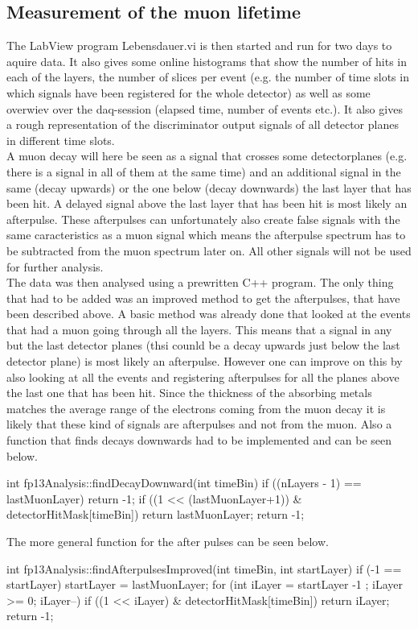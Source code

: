 \subsection{Measurement of the muon lifetime}
The LabView program Lebensdauer.vi is then started and run for two days to aquire data. It also gives some online histograms that show the number of hits in each of the layers, the number of slices per event (e.g. the number of time slots in which signals have been registered for the whole detector) as well as some overwiev over the daq-session (elapsed time, number of events etc.). It also gives a rough representation of the discriminator output signals of all detector planes in different time slots. \\
A muon decay will here be seen as a signal that crosses some detectorplanes (e.g. there is a signal in all of them at the same time) and an additional signal in the same (decay upwards) or the one below (decay downwards) the last layer that has been hit. A delayed signal above the last layer that has been hit is most likely an afterpulse. These afterpulses can unfortunately also create false signals with the same caracteristics as a muon signal which means the afterpulse spectrum has to be subtracted from the muon spectrum later on. All other signals will not be used for further analysis. \\

The data was then analysed using a prewritten C++ program. 
The only thing that had to be added was an improved method to get the afterpulses, that have been described above. A basic method was already done that looked at the events that had a muon going through all the layers. This means that a signal in any but the last detector planes (thsi counld be a decay upwards just below the last detector plane) is most likely an afterpulse. However one can improve on this by also looking at all the events and registering afterpulses for all the planes above the last one that has been hit. Since the thickness of the absorbing metals matches the average range of the electrons coming from the muon decay it is likely that these kind of signals are afterpulses and not from the muon. Also a function that finds decays downwards had to be implemented and can be seen below.
\begin{lstlistings}
int fp13Analysis::findDecayDownward(int timeBin){
    if ((nLayers - 1) == lastMuonLayer)
        return -1;
    if ((1 << (lastMuonLayer+1)) & detectorHitMask[timeBin])
        return lastMuonLayer;
	return -1;
}
\end{lstlistings}
The more general function for the after pulses can be seen below.
\begin{lstlistings}
int fp13Analysis::findAfterpulsesImproved(int timeBin, int startLayer) {
    if (-1 == startLayer) 
    	startLayer = lastMuonLayer;
    for (int iLayer = startLayer -1 ; iLayer >= 0; iLayer--) {
        if ((1 << iLayer) & detectorHitMask[timeBin]) 
        	return iLayer;
    }
	return -1;
}
\end{lstlistings}

